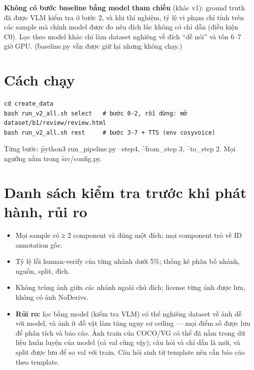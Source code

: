 \documentclass[10.5pt]{article}
\begin{document}
\textbf{Không có bước baseline bằng model tham chiếu} (khác v1): ground truth đã được VLM kiểm tra ở bước 2, và
khi thí nghiệm, tỷ lệ vi phạm chỉ tính trên các sample mà chính model được đo nêu đích lúc không có chỉ dẫn (điều
kiện C0). Lọc theo model khác chỉ làm dataset nghiêng về đích ``dễ nói'' và tốn 6--7 giờ GPU. (\f{baseline.py}
vẫn được giữ lại nhưng không chạy.)

\section{Cách chạy}
\begin{Verbatim}[fontsize=\small,frame=single]
cd create_data
bash run_v2_all.sh select   # bước 0-2, rồi dừng: mở dataset/b1/review/review.html
bash run_v2_all.sh rest     # bước 3-7 + TTS (env cosyvoice)
\end{Verbatim}
Từng bước: \f{python3 run\_pipeline.py --step4}, \f{--from\_step 3}, \f{--to\_step 2}. Mọi ngưỡng nằm trong
\f{src/config.py}.

\section{Danh sách kiểm tra trước khi phát hành, rủi ro}
\begin{itemize}
\item Mọi sample có ≥ 2 component và đúng một đích; mọi component trỏ về ID annotation gốc.
\item Tỷ lệ lỗi human-verify của từng nhánh dưới 5\%; thống kê phân bố nhánh, nguồn, split, đích.
\item Không trùng ảnh giữa các nhánh ngoài chủ đích; license từng ảnh được lưu, không có ảnh NoDerivs.
\item \textbf{Rủi ro:} lọc bằng model (kiểm tra VLM) có thể nghiêng dataset về ảnh dễ với model, và ảnh ít đồ
  vật làm tăng nguy cơ ceiling --- mọi điểm số được lưu để phân tích và báo cáo. Ảnh train của COCO/VG có thể
  đã nằm trong dữ liệu huấn luyện của model (cả val cũng vậy); câu hỏi và chỉ dẫn là mới, và split được lưu để so
  val với train. Câu hỏi sinh từ template nên cần báo cáo theo template.
\end{itemize}
\end{document}
